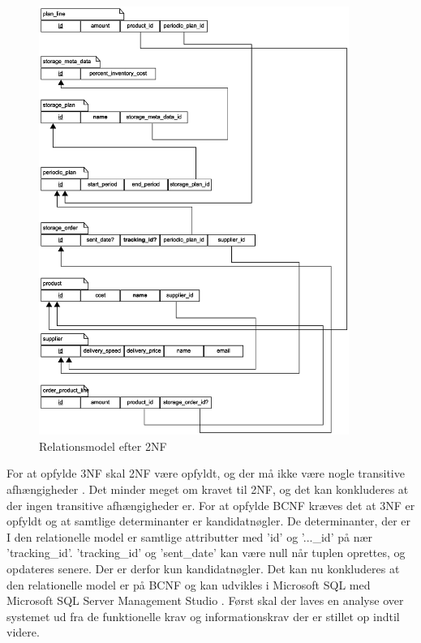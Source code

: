 \begin{figure}[H]
    \centering
    \includegraphics[width=0.9\textwidth]{figures/krav/relation_model_1th_normalization.eps}
    \caption{Relationsmodel efter 2NF}
    \label{fig:relational_model_1}
\end{figure}

For at opfylde 3NF skal 2NF være opfyldt, og der må ikke være nogle transitive afhængigheder \cite{DatabaseSystems}. Det minder meget om kravet til 2NF, og det kan konkluderes at der ingen transitive afhængigheder er.
For at opfylde BCNF kræves det at 3NF er opfyldt og at samtlige determinanter er kandidatnøgler. De determinanter, der er I den relationelle model er samtlige attributter med 'id' og '...\_id' på nær 'tracking\_id'. 'tracking\_id' og 'sent\_date' kan være null når tuplen oprettes, og opdateres senere. Der er derfor kun kandidatnøgler.
Det kan nu konkluderes at den relationelle model er på BCNF og kan udvikles i Microsoft SQL med Microsoft SQL Server Management Studio \cite{MSSQL}. Først skal der laves en analyse over systemet ud fra de funktionelle krav og informationskrav der er stillet op indtil videre. 

